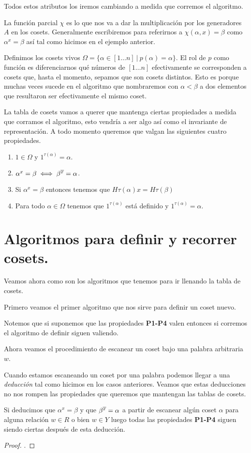 \documentclass[tesis.tex]{subfiles}
\newcommand{\In}{[1 \dots n]}
\begin{document}
Todos estos atributos los iremos cambiando a medida que corremos el algoritmo.

La función parcial $\chi$ es lo que nos va a dar la multiplicación por los generadores $A$ en los cosets. 
Generalmente escribiremos para referirnos a $\chi (\alpha, x) = \beta$ como $\alpha^x = \beta$ así tal como hicimos en el ejemplo anterior.

Definimos los cosets vivos $\Omega = \{ \alpha \in \In  \ | \ p(\alpha) = \alpha \}$.
El rol de $p$ como función es diferenciarnos qué números de $\In$ efectivamente se corresponden a cosets que, hasta el momento, sepamos que son cosets distintos.
Esto es porque muchas veces sucede en el algoritmo que nombraremos con $\alpha < \beta$ a dos elementos que resultaron ser efectivamente el mismo coset.

La tabla de cosets vamos a querer que mantenga ciertas propiedades a medida que corramos el algoritmo, esto vendría a ser algo así como el invariante de representación.
A todo momento queremos que valgan las siguientes cuatro propiedades.
\begin{enumerate}[P1.]
	\item $1 \in \Omega$ y $1^{\tau(\alpha)} = \alpha$.
	\item $\alpha^x = \beta \iff \beta^{\overline x} = \alpha$.
	\item Si $\alpha^x = \beta$ entonces tenemos que $H \tau(\alpha) x = H \tau(\beta)$
	\item Para todo $\alpha \in \Omega$ tenemos que $1^{\tau(\alpha)}$ está definido y $1^{\tau(\alpha)} = \alpha$.
\end{enumerate}
\section{Algoritmos para definir y recorrer cosets.}

Veamos ahora como son los algoritmos que tenemos para ir llenando la tabla de cosets.

Primero veamos el primer algoritmo que nos sirve para definir un coset nuevo.


Notemos que si suponemos que las propiedades \textbf{P1-P4} valen entonces si corremos el algoritmo de definir siguen valiendo.


Ahora veamos el procedimiento de escanear un coset bajo una palabra arbitraria $w$.

Cuando estamos escaneando un coset por una palabra podemos llegar a una \textit{deducción} tal como hicimos en los casos anteriores.
Veamos que estas deducciones no nos rompen las propiedades que queremos que mantengan las tablas de cosets.
\begin{prop}
	Si deducimos que $\alpha^x = \beta$ y que $\beta^{\overline x} = \alpha$ a partir de escanear algún coset $\alpha$ para alguna relación $w \in R$ o bien $w \in Y$ luego todas las propiedades \textbf{P1-P4} siguen siendo ciertas después de esta deducción.
\end{prop}
\begin{proof}
	.
\end{proof}
\end{document}
